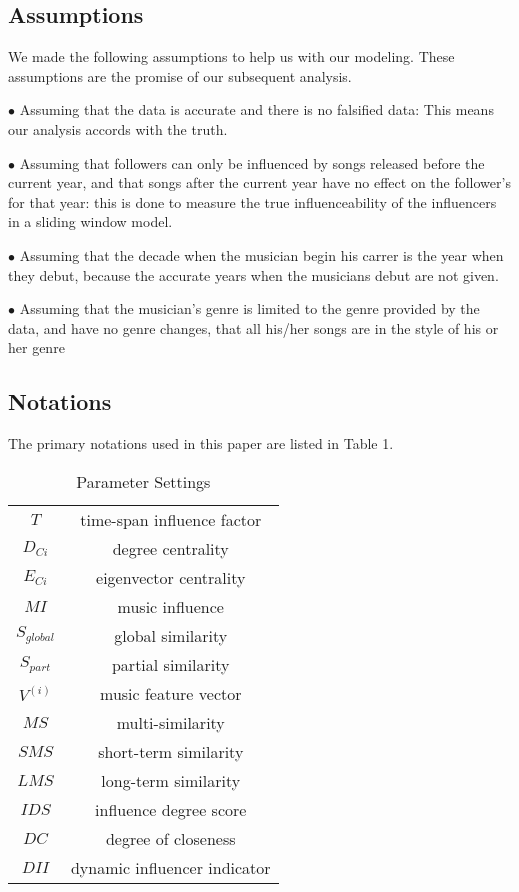 \documentclass[12pt]{article}  %
\begin{document}
\subsection{Assumptions}
\vspace{-0.3cm}
We made the following assumptions to help us with our modeling. These assumptions are the promise of our subsequent analysis.

$\bullet$ Assuming that the data is accurate and there is no  falsified data: This means our analysis accords with the truth.

$\bullet$ Assuming that followers can only be influenced by songs released before the current year, and that songs after the current year have no effect on the follower's for that year: this is done to measure the true influenceability of the influencers in a sliding window model.

$\bullet$ Assuming that the decade when the musician begin his carrer is the year when they debut, because the accurate years when the musicians debut are not given.

$\bullet$ Assuming that the musician's genre is limited to the genre provided by the data, and have no genre changes, that all his/her songs are in the style of his or her genre
\vspace{-0.6cm}

\subsection{Notations}
\vspace{-0.3cm}
The primary notations used in this paper are listed in Table 1.
\vspace{-0.4cm}
\begin{table}[!htbp]
	\caption{Parameter Settings}\label{tab001} \centering
	\begin{tabular}{cc}
		\toprule[1.5pt]
		\makebox[0.25\textwidth][c]{parameter}	&  \makebox[0.45\textwidth][c]{description}\\
		\toprule[1.25pt]
		$T$ & time-span influence factor\\
		$D_{Ci}$ & degree centrality\\ 
		$E_{Ci}$ & eigenvector centrality\\ 
		$MI$ & music influence\\
		$S_{global}$ & global similarity\\
		$S_{part}$ & partial similarity\\
		$V^{(i)}$& music feature vector\\
		$MS$ & multi-similarity\\ 
		$SMS$ & short-term similarity\\
		$LMS$ & long-term similarity\\
		$IDS$ & influence degree score\\
		$DC$ & degree of closeness\\
		$DII$ & dynamic influencer indicator\\
		\bottomrule[1.5pt]
	\end{tabular}
\end{table}
\vspace{-0.6cm}
\end{document}
